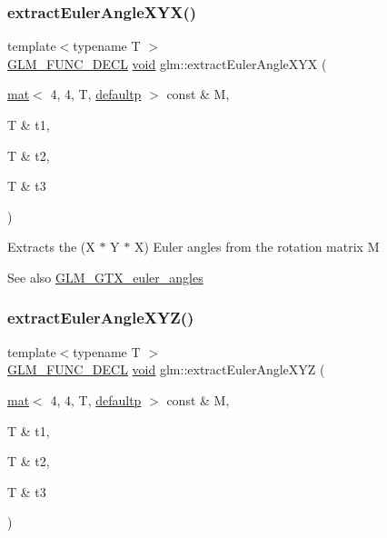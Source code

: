 \subsubsection{\texorpdfstring{extract\+Euler\+Angle\+X\+Y\+X()}{extractEulerAngleXYX()}}
{\footnotesize\ttfamily template$<$typename T $>$ \\
\mbox{\hyperlink{setup_8hpp_ab2d052de21a70539923e9bcbf6e83a51}{G\+L\+M\+\_\+\+F\+U\+N\+C\+\_\+\+D\+E\+CL}} \mbox{\hyperlink{_s_d_l__opengles2__gl2ext_8h_ae5d8fa23ad07c48bb609509eae494c95}{void}} glm\+::extract\+Euler\+Angle\+X\+YX (\begin{DoxyParamCaption}\item[{\mbox{\hyperlink{structglm_1_1mat}{mat}}$<$ 4, 4, T, \mbox{\hyperlink{namespaceglm_a36ed105b07c7746804d7fdc7cc90ff25a9d21ccd8b5a009ec7eb7677befc3bf51}{defaultp}} $>$ const \&}]{M,  }\item[{T \&}]{t1,  }\item[{T \&}]{t2,  }\item[{T \&}]{t3 }\end{DoxyParamCaption})}

Extracts the (X $\ast$ Y $\ast$ X) Euler angles from the rotation matrix M \begin{DoxySeeAlso}{See also}
\mbox{\hyperlink{group__gtx__euler__angles}{G\+L\+M\+\_\+\+G\+T\+X\+\_\+euler\+\_\+angles}} 
\end{DoxySeeAlso}
\mbox{\label{group__gtx__euler__angles_gacea701562f778c1da4d3a0a1cf091000}} 
\subsubsection{\texorpdfstring{extract\+Euler\+Angle\+X\+Y\+Z()}{extractEulerAngleXYZ()}}
{\footnotesize\ttfamily template$<$typename T $>$ \\
\mbox{\hyperlink{setup_8hpp_ab2d052de21a70539923e9bcbf6e83a51}{G\+L\+M\+\_\+\+F\+U\+N\+C\+\_\+\+D\+E\+CL}} \mbox{\hyperlink{_s_d_l__opengles2__gl2ext_8h_ae5d8fa23ad07c48bb609509eae494c95}{void}} glm\+::extract\+Euler\+Angle\+X\+YZ (\begin{DoxyParamCaption}\item[{\mbox{\hyperlink{structglm_1_1mat}{mat}}$<$ 4, 4, T, \mbox{\hyperlink{namespaceglm_a36ed105b07c7746804d7fdc7cc90ff25a9d21ccd8b5a009ec7eb7677befc3bf51}{defaultp}} $>$ const \&}]{M,  }\item[{T \&}]{t1,  }\item[{T \&}]{t2,  }\item[{T \&}]{t3 }\end{DoxyParamCaption})}

